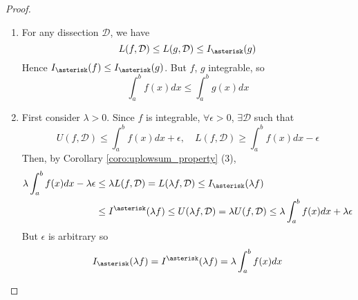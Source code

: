 \documentclass[10pt, a4paper, twoside]{report}
\begin{document}
\begin{proof} \item[]
    \begin{enumerate}
        \item For any dissection \(\mathcal{D}\), we have 
        \[L(f,\mathcal{D})\leq L(g,\mathcal{D})\leq I_\asterisk(g)\]
        Hence \(I_\asterisk(f)\leq I_\asterisk(g)\). But \(f\), \(g\) integrable, so 
        \[\int_a^bf(x)dx\leq\int_a^bg(x)dx\]
        \item First consider \(\lambda>0\). Since \(f\) is integrable, \(\forall\epsilon>0\), \(\exists\mathcal{D}\) such that 
        \[U(f,\mathcal{D})\leq\int_a^bf(x)dx+\epsilon,\quad L(f,\mathcal{D})\geq\int_a^bf(x)dx-\epsilon\]
        Then, by Corollary \ref{coro:uplowsum_property} (3), 
        \begin{align*}
            \lambda\int_a^bf(x)dx-\lambda\epsilon&\leq\lambda L(f,\mathcal{D})=L(\lambda f,\mathcal{D})\leq I_\asterisk(\lambda f) \\
            &\leq I^\asterisk(\lambda f)\leq U(\lambda f,\mathcal{D})=\lambda U(f,\mathcal{D})\leq\lambda\int_a^b f(x)dx+\lambda\epsilon
        \end{align*}
        But \(\epsilon\) is arbitrary so
        \[I_\asterisk(\lambda f)=I^\asterisk(\lambda f)=\lambda\int_a^bf(x)dx\]
        

\end{enumerate}
\end{proof}
\end{document}
